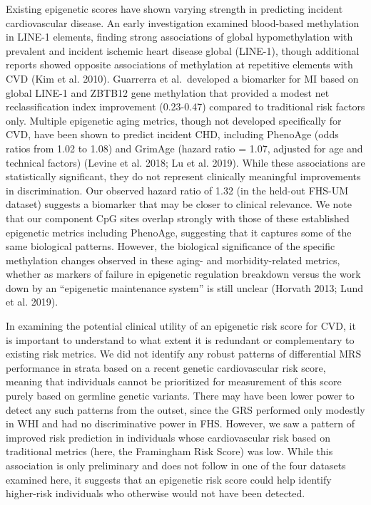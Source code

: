 \documentclass[]{article}
\begin{document}
Existing epigenetic scores have shown varying strength in predicting
incident cardiovascular disease. An early investigation examined
blood-based methylation in LINE-1 elements, finding strong associations
of global hypomethylation with prevalent and incident ischemic heart
disease global (LINE-1), though additional reports showed opposite
associations of methylation at repetitive elements with CVD (Kim et al.
2010). Guarrerra et al.~developed a biomarker for MI based on global
LINE-1 and ZBTB12 gene methylation that provided a modest net
reclassification index improvement (0.23-0.47) compared to traditional
risk factors only. Multiple epigenetic aging metrics, though not
developed specifically for CVD, have been shown to predict incident CHD,
including PhenoAge (odds ratios from 1.02 to 1.08) and GrimAge (hazard
ratio = 1.07, adjusted for age and technical factors) (Levine et al.
2018; Lu et al. 2019). While these associations are statistically
significant, they do not represent clinically meaningful improvements in
discrimination. Our observed hazard ratio of 1.32 (in the held-out
FHS-UM dataset) suggests a biomarker that may be closer to clinical
relevance. We note that our component CpG sites overlap strongly with
those of these established epigenetic metrics including PhenoAge,
suggesting that it captures some of the same biological patterns.
However, the biological significance of the specific methylation changes
observed in these aging- and morbidity-related metrics, whether as
markers of failure in epigenetic regulation breakdown versus the work
down by an ``epigenetic maintenance system'' is still unclear (Horvath
2013; Lund et al. 2019).

In examining the potential clinical utility of an epigenetic risk score
for CVD, it is important to understand to what extent it is redundant or
complementary to existing risk metrics. We did not identify any robust
patterns of differential MRS performance in strata based on a recent
genetic cardiovascular risk score, meaning that individuals cannot be
prioritized for measurement of this score purely based on germline
genetic variants. There may have been lower power to detect any such
patterns from the outset, since the GRS performed only modestly in WHI
and had no discriminative power in FHS. However, we saw a pattern of
improved risk prediction in individuals whose cardiovascular risk based
on traditional metrics (here, the Framingham Risk Score) was low. While
this association is only preliminary and does not follow in one of the
four datasets examined here, it suggests that an epigenetic risk score
could help identify higher-risk individuals who otherwise would not have
been detected.
\end{document}
